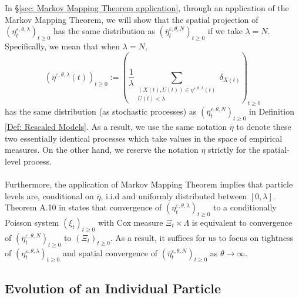 \documentclass[12pt]{article}
\begin{document}
In \S \ref{sec: Markov Mapping Theorem application}, through an application of the Markov Mapping Theorem, we will show that the spatial projection of $(\eta^{\varepsilon, \theta, \lambda}_t)_{t \geq 0}$ has the same distribution as $(\overline{\eta}^{\varepsilon, \theta, N}_t)_{t \geq 0}$ if we take $\lambda = N$. Specifically, we mean that when $\lambda=N$, 
$$(\overline{\eta}^{\varepsilon,\theta, \lambda}(t))_{t \geq 0}:=\left(\frac{1}{\lambda}\sum\limits_{\substack{(X(t),U(t))\in \eta^{\varepsilon,\theta, \lambda}(t) \\ U(t) < \lambda}} \delta_{X(t)}\right)_{t \geq 0}$$
has the same distribution (as stochastic processes) as $(\overline{\eta}^{\varepsilon,\theta, N}_t)_{t \geq 0}$ in Definition \ref{Def: Rescaled Models}. As a result, we use the same notation $\overline{\eta}$ to denote these two essentially identical processes which take values in the space of empirical measures. On the other hand, we reserve the notation $\eta$ strictly for the spatial-level process.\\~\\ Furthermore, the application of Markov Mapping Theorem implies that particle levels are, conditional on $\overline{\eta}$, i.i.d and uniformly distributed between $[0, \lambda]$.  Theorem A.10 in \cite{kurtz/rodrigues:2011} states that convergence of $(\eta^{\varepsilon, \theta, \lambda}_t)_{t \geq 0}$ to a conditionally Poisson system $(\xi_t)_{t \geq 0}$ with Cox measure $\Xi_t \times \Lambda$ is equivalent to convergence of $(\overline{\eta}^{\varepsilon, \theta, N}_t)_{t \geq 0}$ to $(\Xi_t)_{t \geq 0}$. As a result, it suffices for us to focus on tightness of $(\eta^{\varepsilon, \theta, \lambda}_t)_{t \geq 0}$ and spatial convergence of $(\overline{\eta}^{\varepsilon, \theta, N}_t)_{t \geq 0}$ as $\theta \to \infty$.




\subsection{Evolution of an Individual Particle}
\label{sec: Evolution of an Individual Particle}
\end{document}
